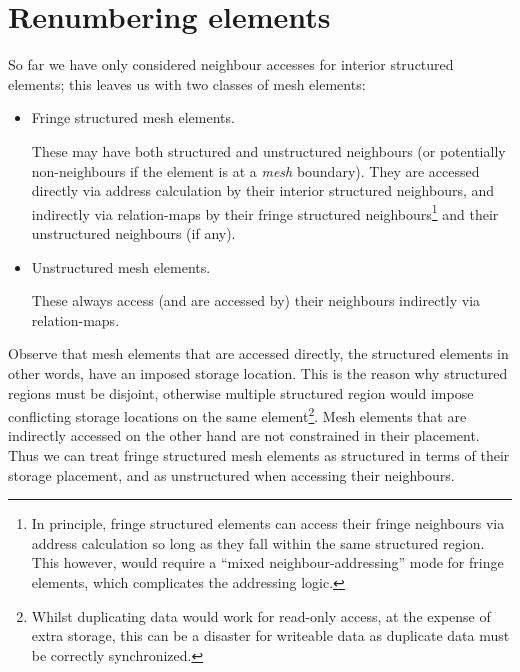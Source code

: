 \section{Renumbering elements}
\label{sec:renumbering-elements}
So far we have only considered neighbour accesses for interior structured elements; this leaves us with two classes of mesh elements:
\begin{itemize}
\item Fringe structured mesh elements.

These may have both structured and unstructured neighbours (or potentially non-neighbours if the element is at a \emph{mesh} boundary). They are accessed directly via address calculation by their interior structured neighbours, and indirectly via relation-maps by their fringe structured neighbours\footnote{In principle, fringe structured elements can access their fringe neighbours via address calculation so long as they fall within the same structured region. This however, would require a ``mixed neighbour-addressing'' mode for fringe elements, which complicates the addressing logic.} and their unstructured neighbours (if any).

\item Unstructured mesh elements.

These always access (and are accessed by) their neighbours indirectly via relation-maps.
\end{itemize}

Observe that mesh elements that are accessed directly, the structured elements in other words, have an imposed storage location. This is the reason why structured regions must be disjoint, otherwise multiple structured region would impose conflicting storage locations on the same element\footnote{Whilst duplicating data would work for read-only access, at the expense of extra storage, this can be a disaster for writeable data as duplicate data must be correctly synchronized.}. Mesh elements that are indirectly accessed on the other hand are not constrained in their placement. Thus we can treat fringe structured mesh elements as structured in terms of their storage placement, and as unstructured when accessing their neighbours.

